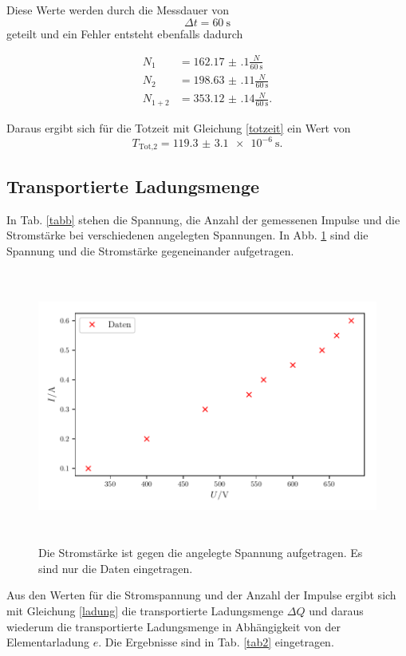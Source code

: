 \noindent Diese Werte werden durch die Messdauer von
\begin{equation*}
    \Delta t = \SI{60}{\second}
\end{equation*}
geteilt und ein Fehler entsteht ebenfalls dadurch %

\begin{align*} 
   N_1 &= \num{162.17(10)} \frac{N}{\SI{60}{\second}}\\
   N_2 &= \num{198.63(11)} \frac{N}{\SI{60}{\second}} \\
   N_{1+2} &=\num{353.12(14)} \frac{N}{\SI{60}{\second}}.
\end{align*}

\noindent Daraus ergibt sich für die Totzeit mit Gleichung \eqref{totzeit}
ein Wert von 
\begin{equation*} 
    T_\text{Tot,2} = \SI{119.3(31)e-6}{\second}.
\end{equation*} 

\subsection{Transportierte Ladungsmenge}
In Tab. \ref{tabb} stehen die Spannung, die Anzahl der gemessenen Impulse und die Stromstärke bei verschiedenen angelegten Spannungen.
In Abb. \ref{fig2} sind die Spannung und die Stromstärke gegeneinander aufgetragen. 



\begin{figure}
    \centering
    \includegraphics[width=15cm, height=9cm]{build/plot2.pdf}
    \caption{Die Stromstärke ist gegen die angelegte Spannung aufgetragen. Es sind nur die Daten eingetragen.}
    \label{fig2}
\end{figure}

\noindent Aus den Werten für die Stromspannung und der Anzahl der Impulse ergibt sich mit Gleichung \eqref{ladung} die transportierte Ladungsmenge $\Delta Q$ und daraus wiederum die transportierte Ladungsmenge in Abhängigkeit von der Elementarladung $e$. Die Ergebnisse sind in Tab. \ref{tab2} eingetragen. 




